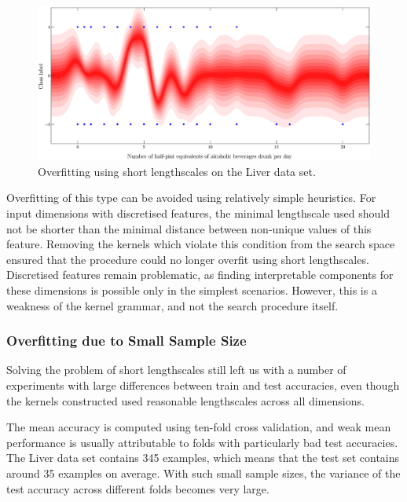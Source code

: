 \documentclass[a4paper,12pt ]{report}
\begin{document}
\begin{figure} [!ht]
\caption{Overfitting using short lengthscales on the Liver data set. }
\begin{center}
\includegraphics[trim=0cm 0cm 0cm 0cm, width=1\textwidth]{figures/overfitsmall.eps}
\end{center}
\end{figure}

Overfitting of this type can be avoided using relatively simple heuristics. For input dimensions with discretised features, the minimal lengthscale used should not be shorter than the minimal distance between non-unique values of this feature. Removing the kernels which violate this condition from the search space ensured that the procedure could no longer overfit using short lengthscales. Discretised features remain problematic, as finding interpretable components for these dimensions is possible only in the simplest scenarios. However, this is a weakness of the kernel grammar, and not the search procedure itself.

\subsubsection*{Overfitting due to Small Sample Size}

Solving the problem of short lengthscales still left us with a number of experiments with large differences between train and test accuracies, even though the kernels constructed used reasonable lengthscales across all dimensions.

The mean accuracy is computed using ten-fold cross validation, and weak mean performance is usually attributable to folds with particularly bad test accuracies. The Liver data set contains 345 examples, which means that the test set contains around 35 examples on average. With such small sample sizes, the variance of the test accuracy across different folds becomes very large.
\end{document}
